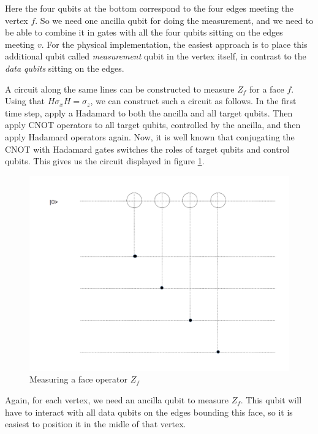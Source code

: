 \documentclass[a4paper, draft]{article}
\theoremstyle{own}
\theoremstyle{remark}
\begin{document}
Here the four qubits at the bottom correspond to the four edges meeting the vertex $f$. So we need one ancilla qubit for doing the measurement, and we need to be able to combine it in gates with all the four qubits sitting on the edges meeting $v$. For the physical implementation, the easiest approach is to place this additional qubit called \emph{measurement} qubit in the vertex itself, in contrast to the \emph{data qubits} sitting on the edges.

A circuit along the same lines can be constructed to measure $Z_f$ for a face $f$. Using that $H \sigma_x H = \sigma_z$, we can construct such a circuit as follows. In the first time step, apply a Hadamard to both the ancilla and all target qubits. Then apply CNOT operators to all target qubits, controlled by the ancilla, and then apply Hadamard operators again. Now, it is well known that conjugating the CNOT with Hadamard gates switches the roles of target qubits and control qubits. This gives us the circuit displayed in figure \ref{fig:MeasuringZv}.


\begin{figure}
\centering
\includegraphics[width=0.7\linewidth]{images/MeasuringZv}
\caption[Measuring a face operator $Z_f$]{Measuring a face operator $Z_f$}
\label{fig:MeasuringZv}
\end{figure}

Again, for each vertex, we need an ancilla qubit to measure $Z_f$. This qubit will have to interact with all data qubits on the edges bounding this face, so it is easiest to position it in the midle of that vertex. 
\end{document}
